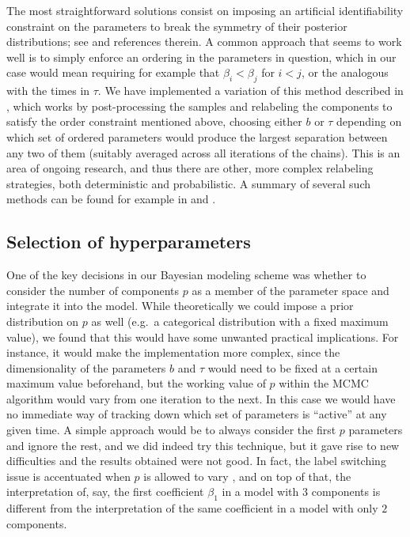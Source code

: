The most straightforward solutions consist on imposing an artificial identifiability constraint on the parameters to break the symmetry of their posterior distributions; see \citet{jasra2005markov} and references therein. A common approach that seems to work well is to simply enforce an ordering in the parameters in question, which in our case would mean requiring for example that \(\beta_i < \beta_j\) for \(i < j\), or the analogous with the times in \(\tau\). We have implemented a variation of this method described in \citet{simola2021approximate}, which works by post-processing the samples and relabeling the components to satisfy the order constraint mentioned above, choosing either \(b\) or \(\tau\) depending on which set of ordered parameters would produce the largest separation between any two of them (suitably averaged across all iterations of the chains). This is an area of ongoing research, and thus there are other, more complex relabeling strategies, both deterministic and probabilistic. A summary of several such methods can be found for example in \citet{rodriguez2014label} and \citet{papastamoulis2015label}.

\subsection{Selection of hyperparameters}\label{app:hyperparameters}

One of the key decisions in our Bayesian modeling scheme was whether to consider the number of components \(p\) as a member of the parameter space and integrate it into the model. While theoretically we could impose a prior distribution on \(p\) as well (e.g.\ a categorical distribution with a fixed maximum value), we found that this would have some unwanted practical implications. For instance, it would make the implementation more complex, since the dimensionality of the parameters \(b\) and \(\tau\) would need to be fixed at a certain maximum value beforehand, but the working value of \(p\) within the MCMC algorithm would vary from one iteration to the next. In this case we would have no immediate way of tracking down which set of parameters is ``active'' at any given time. A simple approach would be to always consider the first \(p\) parameters and ignore the rest, and we did indeed try this technique, but it gave rise to new difficulties and the results obtained were not good. In fact, the label switching issue is accentuated when \(p\) is allowed to vary \citep[c.f.][Section~2.3]{grollemund2019bayesian}, and on top of that, the interpretation of, say, the first coefficient \(\beta_1\) in a model with \(3\) components is different from the interpretation of the same coefficient in a model with only \(2\) components.

